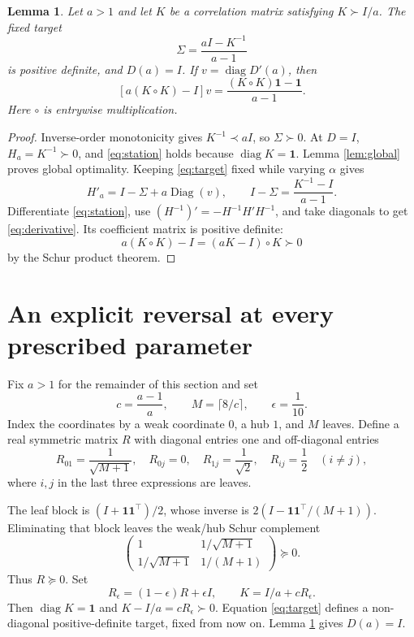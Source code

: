 \documentclass[11pt]{article}
\newtheorem{lemma}[theorem]{Lemma}
\theoremstyle{remark}\newtheorem{remark}[theorem]{Remark}
\newcommand{\diag}{\operatorname{diag}}
\newcommand{\Diag}{\operatorname{Diag}}
\newcommand{\one}{\mathbf{1}}
\begin{document}
\begin{lemma}\label{lem:K}
Let $a>1$ and let $K$ be a correlation matrix satisfying $K\succ I/a$.
The fixed target
\begin{equation}\label{eq:target}
 \Sigma=\frac{aI-K^{-1}}{a-1}
\end{equation}
is positive definite, and $D(a)=I$. If $v=\diag D'(a)$, then
\begin{equation}\label{eq:derivative}
 [a(K\circ K)-I]v
 =\frac{(K\circ K)\one-\one}{a-1}.
\end{equation}
Here $\circ$ is entrywise multiplication.
\end{lemma}
\begin{proof}
Inverse-order monotonicity gives $K^{-1}\prec aI$, so $\Sigma\succ0$.
At $D=I$, $H_a=K^{-1}\succ0$, and \eqref{eq:station} holds because
$\diag K=\one$. Lemma \ref{lem:global} proves global optimality.
Keeping \eqref{eq:target} fixed while varying $\alpha$ gives
\[
 H'_a=I-\Sigma+a\Diag(v),\qquad
 I-\Sigma=\frac{K^{-1}-I}{a-1}.
\]
Differentiate \eqref{eq:station}, use
$(H^{-1})'=-H^{-1}H'H^{-1}$, and take diagonals to get
\eqref{eq:derivative}. Its coefficient matrix is positive definite:
\[
 a(K\circ K)-I=(aK-I)\circ K\succ0
\]
by the Schur product theorem.
\end{proof}

\section{An explicit reversal at every prescribed parameter}
Fix $a>1$ for the remainder of this section and set
\[
 c=\frac{a-1}{a},\qquad M=\lceil8/c\rceil,\qquad \epsilon=\frac1{10}.
\]
Index the coordinates by a weak coordinate $0$, a hub $1$, and $M$
leaves. Define a real symmetric matrix $R$ with diagonal entries one
and off-diagonal entries
\begin{equation}\label{eq:R}
 R_{01}=\frac1{\sqrt{M+1}},\quad
 R_{0j}=0,\quad R_{1j}=\frac1{\sqrt2},\quad
 R_{ij}=\frac12\quad(i\ne j),
\end{equation}
where $i,j$ in the last three expressions are leaves.

The leaf block is $(I+\one\one^\top)/2$, whose inverse is
$2(I-\one\one^\top/(M+1))$. Eliminating that block leaves the
weak/hub Schur complement
\[
 \begin{pmatrix}
 1&1/\sqrt{M+1}\\
 1/\sqrt{M+1}&1/(M+1)
 \end{pmatrix}\succeq0.
\]
Thus $R\succeq0$. Set
\[
 R_\epsilon=(1-\epsilon)R+\epsilon I,\qquad
 K=I/a+cR_\epsilon.
\]
Then $\diag K=\one$ and $K-I/a=cR_\epsilon\succ0$.
Equation \eqref{eq:target} defines a non-diagonal positive-definite
target, fixed from now on. Lemma \ref{lem:K} gives $D(a)=I$.
\end{document}
